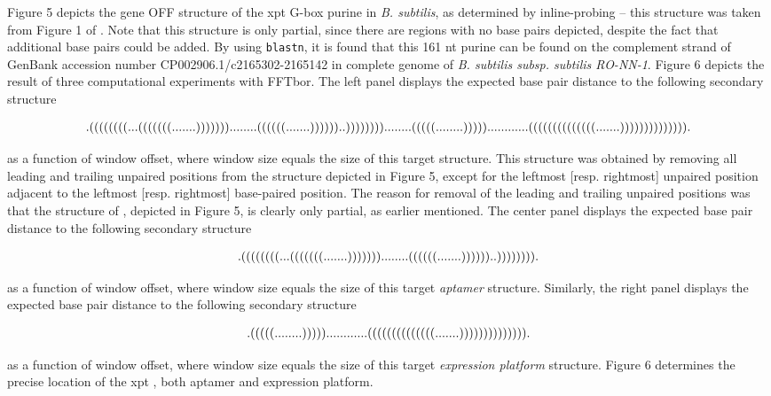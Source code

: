 Figure 5 depicts the gene OFF structure of the
xpt G-box purine \rb in {\em B. subtilis}, as determined by
inline-probing -- this structure was taken from
Figure 1 of \citep{breaker:Riboswitch2}.
Note that this structure is only partial, since there are regions
with no base pairs depicted, despite the fact that additional
base pairs could be added. By using
{\tt blastn}, it is found that this 161 nt purine \rb
can be found on the complement strand of GenBank accession number
CP002906.1/c2165302-2165142 in
complete genome of {\em B. subtilis subsp. subtilis RO-NN-1}.
Figure 6 depicts the result of
three computational experiments with FFTbor. The left panel displays
the expected base pair distance to the following secondary structure
\begin{small}
\begin{eqnarray}
\label{eq:xpt1}
\bf
.((((((((...(((((((.......)))))))........((((((.......))))))..))))))))........(((((........)))))............((((((((((((((.......)))))))))))))).
\end{eqnarray}
\end{small}
as a function of window offset, where window size equals the size of this
target structure. This structure was
obtained by removing all leading and trailing unpaired positions
from the structure depicted in Figure 5,
except for the leftmost [resp. rightmost] unpaired position
adjacent to the leftmost [resp. rightmost] base-paired position.
The reason for removal of the leading and trailing unpaired positions was
that the structure of \citep{breaker:Riboswitch2}, depicted in
Figure 5, is clearly only partial, as earlier
mentioned.  The center panel displays
the expected base pair distance to the following secondary structure
\begin{small}
\begin{eqnarray}
\label{eq:xpt2}
\bf
.((((((((...(((((((.......)))))))........((((((.......))))))..)))))))).
\end{eqnarray}
\end{small}
as a function of window offset, where window size equals the size of this
target {\em aptamer} structure. Similarly, the right panel displays
the expected base pair distance to the following secondary structure
\begin{small}
\begin{eqnarray}
\label{eq:xpt3}
\bf
.(((((........)))))............((((((((((((((.......)))))))))))))).
\end{eqnarray}
\end{small}
as a function of window offset, where window size equals the size of this
target {\em expression platform} structure.
Figure 6 determines the precise location of the
xpt \rb, both aptamer and expression platform.

